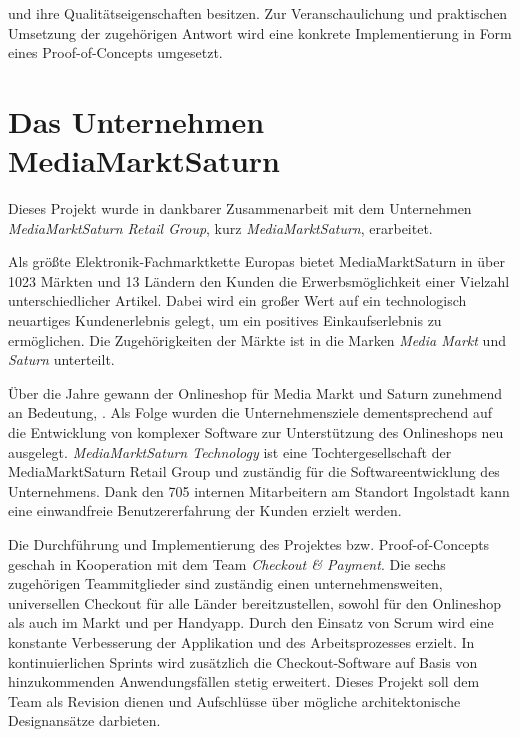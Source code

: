 und ihre Qualitätseigenschaften besitzen. Zur Veranschaulichung und praktischen Umsetzung der zugehörigen Antwort wird eine konkrete Implementierung in Form eines Proof-of-Concepts umgesetzt.

\section{Das Unternehmen MediaMarktSaturn}

Dieses Projekt wurde in dankbarer Zusammenarbeit mit dem Unternehmen \emph{MediaMarktSaturn Retail Group}, kurz \emph{MediaMarktSaturn}, erarbeitet.

Als größte Elektronik-Fachmarktkette Europas bietet MediaMarktSaturn in über 1023 Märkten und 13 Ländern den Kunden die Erwerbsmöglichkeit einer Vielzahl unterschiedlicher Artikel. Dabei wird ein großer Wert auf ein technologisch neuartiges Kundenerlebnis gelegt, um ein positives Einkaufserlebnis zu ermöglichen. Die Zugehörigkeiten der Märkte ist in die Marken \emph{Media Markt} und \emph{Saturn} unterteilt.

Über die Jahre gewann der Onlineshop für Media Markt und Saturn zunehmend an Bedeutung, . Als Folge wurden die Unternehmensziele dementsprechend auf die Entwicklung von komplexer Software zur Unterstützung des Onlineshops neu ausgelegt. \emph{MediaMarktSaturn Technology} ist eine Tochtergesellschaft der MediaMarktSaturn Retail Group und zuständig für die Softwareentwicklung des Unternehmens. Dank den 705 internen Mitarbeitern am Standort Ingolstadt kann eine einwandfreie Benutzererfahrung der Kunden erzielt werden. 

Die Durchführung und Implementierung des Projektes bzw. Proof-of-Concepts geschah in Kooperation mit dem Team \emph{Checkout \& Payment}. Die sechs zugehörigen Teammitglieder sind zuständig einen unternehmensweiten, universellen Checkout für alle Länder bereitzustellen, sowohl für den Onlineshop als auch im Markt und per Handyapp. Durch den Einsatz von \Gls{Scrum} wird eine konstante Verbesserung der Applikation und des Arbeitsprozesses erzielt. In kontinuierlichen \Glspl{Sprint} wird zusätzlich die Checkout-Software auf Basis von hinzukommenden Anwendungsfällen stetig erweitert. Dieses Projekt soll dem Team als Revision dienen und Aufschlüsse über mögliche architektonische Designansätze darbieten.



